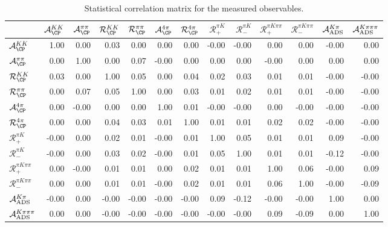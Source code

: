 \begin{table}
\centering
\footnotesize
\caption{Statistical correlation matrix for the measured observables.}
\begin{tabular}{l|rrrrrrrrrrrr}
& $\mathcal{A}_{\CP}^{KK}$& $\mathcal{A}_{\CP}^{\pi\pi}$& $\mathcal{R}_{\CP}^{KK}$& $\mathcal{R}_{\CP}^{\pi\pi}$& $\mathcal{A}_{\CP}^{4\pi}$& $\mathcal{R}_{\CP}^{4\pi}$& $\mathcal{R}_+^{\pi K}$& $\mathcal{R}_-^{\pi K}$& $\mathcal{R}_+^{\pi K\pi\pi}$& $\mathcal{R}_-^{\pi K\pi\pi}$& $\mathcal{A}_{\rm ADS}^{K\pi}$& $\mathcal{A}_{\rm ADS}^{K\pi\pi\pi}$ \\
\midrule

$\mathcal{A}_{\CP}^{KK}$& 1.00& 0.00& 0.03& 0.00& 0.00& 0.00& -0.00& -0.00& 0.00& 0.00& -0.00& 0.00 \\

$\mathcal{A}_{\CP}^{\pi\pi}$& 0.00& 1.00& 0.00& 0.07& -0.00& 0.00& 0.00& 0.00& -0.00& 0.00& 0.00& 0.00 \\

$\mathcal{R}_{\CP}^{KK}$& 0.03& 0.00& 1.00& 0.05& 0.00& 0.04& 0.02& 0.03& 0.01& 0.01& -0.00& -0.00 \\

$\mathcal{R}_{\CP}^{\pi\pi}$& 0.00& 0.07& 0.05& 1.00& 0.00& 0.03& 0.01& 0.02& 0.01& 0.01& -0.00& -0.00 \\

$\mathcal{A}_{\CP}^{4\pi}$& 0.00& -0.00& 0.00& 0.00& 1.00& 0.01& -0.00& -0.00& 0.00& -0.00& -0.00& -0.00 \\

$\mathcal{R}_{\CP}^{4\pi}$& 0.00& 0.00& 0.04& 0.03& 0.01& 1.00& 0.01& 0.01& 0.02& 0.02& -0.00& -0.00 \\

$\mathcal{R}_+^{\pi K}$& -0.00& 0.00& 0.02& 0.01& -0.00& 0.01& 1.00& 0.05& 0.01& 0.01& 0.09& -0.00 \\

$\mathcal{R}_-^{\pi K}$& -0.00& 0.00& 0.03& 0.02& -0.00& 0.01& 0.05& 1.00& 0.01& 0.01& -0.12& -0.00 \\

$\mathcal{R}_+^{\pi K\pi\pi}$& 0.00& -0.00& 0.01& 0.01& 0.00& 0.02& 0.01& 0.01& 1.00& 0.06& -0.00& 0.09 \\

$\mathcal{R}_-^{\pi K\pi\pi}$& 0.00& 0.00& 0.01& 0.01& -0.00& 0.02& 0.01& 0.01& 0.06& 1.00& -0.00& -0.09 \\

$\mathcal{A}_{\rm ADS}^{K\pi}$& -0.00& 0.00& -0.00& -0.00& -0.00& -0.00& 0.09& -0.12& -0.00& -0.00& 1.00& 0.00 \\

$\mathcal{A}_{\rm ADS}^{K\pi\pi\pi}$& 0.00& 0.00& -0.00& -0.00& -0.00& -0.00& -0.00& -0.00& 0.09& -0.09& 0.00& 1.00 \\
\end{tabular}
\end{table}
\label{tab:stat_correlation}
